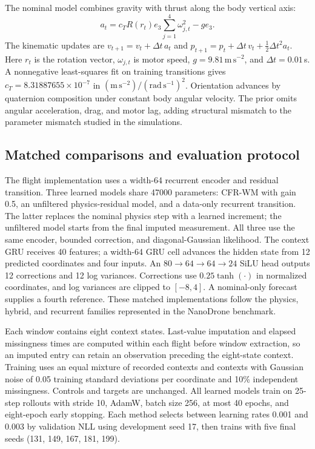 \documentclass[iicol,pdflatex,sn-basic,Numbered]{sn-jnl}
\newcommand{\ExternalLearnedParameters}{47000}
\begin{document}
The nominal model combines gravity with thrust along the body vertical axis:
\begin{equation}
 a_t=c_T R(r_t)e_3\sum_{j=1}^{4}\omega_{j,t}^{2}-g e_3.
 \label{eq:flight-prior}
\end{equation}
The kinematic updates are
$v_{t+1}=v_t+\Delta t\,a_t$ and
$p_{t+1}=p_t+\Delta t\,v_t+\tfrac12\Delta t^2a_t$.
Here $r_t$ is the rotation vector, $\omega_{j,t}$ is motor speed,
$g=9.81\,\mathrm{m\,s^{-2}}$, and $\Delta t=0.01$\,s. A nonnegative
least-squares fit on training transitions gives
$c_T=8.31887655\times10^{-7}$ in
$(\mathrm{m\,s^{-2}})/(\mathrm{rad\,s^{-1}})^2$.
Orientation advances by quaternion composition under constant body angular
velocity. The prior omits angular acceleration, drag, and motor lag, adding
structural mismatch to the parameter mismatch studied in the simulations.

\subsection{Matched comparisons and evaluation protocol}

The flight implementation uses a width-64 recurrent encoder and residual
transition. Three learned models share \ExternalLearnedParameters{} parameters:
CFR-WM with gain 0.5, an unfiltered physics-residual model, and a data-only
recurrent transition. The latter replaces the nominal physics step with a
learned increment; the unfiltered model starts from the final imputed
measurement. All three use the same encoder, bounded correction, and
diagonal-Gaussian likelihood. The context GRU receives 40 features; a
width-64 GRU cell advances the hidden state from 12 predicted coordinates and
four inputs. An $80\!\to\!64\!\to\!64\!\to\!24$ SiLU head outputs
12 corrections and 12 log variances. Corrections use $0.25\tanh(\cdot)$ in
normalized coordinates, and log variances are clipped to $[-8,4]$.
A nominal-only forecast supplies a fourth
reference. These matched implementations follow the physics, hybrid, and
recurrent families represented in the NanoDrone benchmark.

Each window contains eight context states. Last-value imputation and elapsed
missingness times are computed within each flight before window extraction,
so an imputed entry can retain an observation preceding the eight-state
context. Training uses an equal mixture of recorded contexts and contexts
with Gaussian noise of 0.05 training standard deviations per coordinate and
10\% independent missingness. Controls and targets are unchanged. All learned
models train on 25-step rollouts with stride 10, AdamW, batch size 256, at most
40 epochs, and eight-epoch early stopping. Each method selects between
learning rates 0.001 and 0.003 by validation NLL using development seed 17,
then trains with five final seeds (131, 149, 167, 181, 199).
\end{document}
